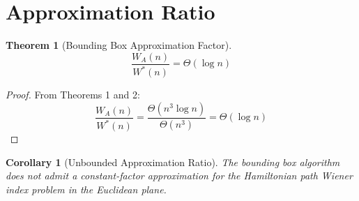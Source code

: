 \documentclass{article}
\newtheorem{theorem}{Theorem}
\newtheorem*{corollary}{Corollary}
\begin{document}
\section{Approximation Ratio}

\begin{theorem}[Bounding Box Approximation Factor]
\[
    \frac{W_A(n)}{W^*(n)} = \Theta(\log n)
\]
\end{theorem}

\begin{proof}
From Theorems 1 and 2:
\[
    \frac{W_A(n)}{W^*(n)} = \frac{\Theta(n^3 \log n)}{\Theta(n^3)} = \Theta(\log n)
\]
\end{proof}

\begin{corollary}[Unbounded Approximation Ratio]
The bounding box algorithm does not admit a constant-factor approximation for the Hamiltonian path Wiener index problem in the Euclidean plane.
\end{corollary}
\end{document}
